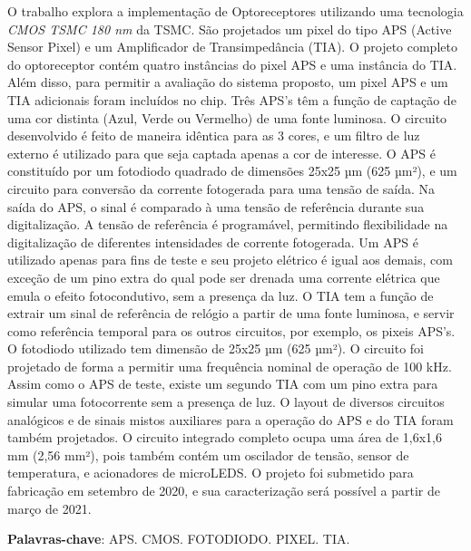 
\setlength{\absparsep}{18pt} %
\begin{resumo}

O trabalho explora a implementação de Optoreceptores utilizando uma tecnologia \textit{CMOS TSMC 180 nm} da TSMC. São projetados um pixel do tipo APS (Active Sensor Pixel) e um Amplificador de Transimpedância (TIA). O projeto completo do optoreceptor contém quatro instâncias do pixel APS e uma instância do TIA. Além disso, para permitir a avaliação do sistema proposto, um pixel APS e um TIA adicionais foram incluídos no chip. Três APS’s t\^em a função de captação de uma cor distinta (Azul, Verde ou Vermelho) de uma fonte luminosa. O circuito desenvolvido é feito de maneira idêntica para as 3 cores, e um filtro de luz externo é utilizado para que seja captada apenas a cor de interesse. O APS é constituído por um fotodiodo quadrado de dimensões 25x25 µm (625 µm²), e um circuito para conversão da corrente fotogerada para uma tensão de saída. Na saída do APS, o sinal é comparado à uma tensão de referência durante sua digitalização. A tensão de referência é programável, permitindo flexibilidade na digitalização de diferentes intensidades de corrente fotogerada. Um APS é utilizado apenas para fins de teste e seu projeto elétrico é igual aos demais, com exceção de um pino extra do qual pode ser drenada uma corrente elétrica que emula o efeito fotocondutivo, sem a presença da luz. O TIA tem a função de extrair um sinal de referência de relógio a partir de uma fonte luminosa, e servir como referência temporal para os outros circuitos, por exemplo, os pixeis APS’s. O fotodiodo utilizado tem dimensão de 25x25 µm (625 µm²). O circuito foi projetado de forma a permitir uma frequência nominal de operação de 100 kHz. Assim como o APS de teste, existe um segundo TIA com um pino extra para simular uma fotocorrente sem a presença de luz. O layout de diversos circuitos analógicos e de sinais mistos auxiliares para a operação do APS e do TIA foram também projetados. O circuito integrado completo ocupa uma área de 1,6x1,6 mm (2,56 mm²), pois também contém um oscilador de tensão, sensor de temperatura, e acionadores de microLEDS. O projeto foi submetido para fabricação em setembro de 2020, e sua caracterização será possível a partir de março de 2021.

\vspace{\onelineskip}
 
   \noindent 

 \textbf{Palavras-chave}: APS. CMOS. FOTODIODO. PIXEL. TIA.
\end{resumo}